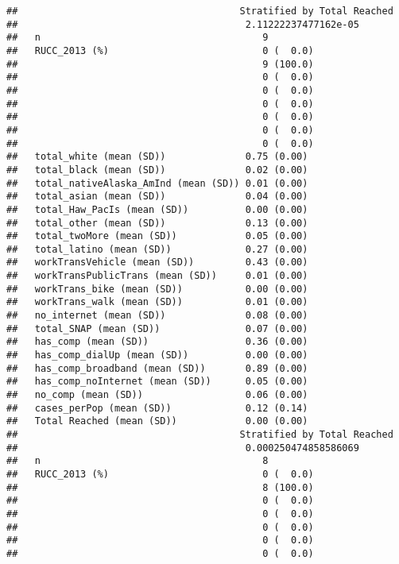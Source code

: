 \documentclass[
]{article}
\begin{document}
\begin{verbatim}
##                                       Stratified by Total Reached
##                                        2.11222237477162e-05
##   n                                       9                
##   RUCC_2013 (%)                           0 (  0.0)        
##                                           9 (100.0)        
##                                           0 (  0.0)        
##                                           0 (  0.0)        
##                                           0 (  0.0)        
##                                           0 (  0.0)        
##                                           0 (  0.0)        
##                                           0 (  0.0)        
##   total_white (mean (SD))              0.75 (0.00)         
##   total_black (mean (SD))              0.02 (0.00)         
##   total_nativeAlaska_AmInd (mean (SD)) 0.01 (0.00)         
##   total_asian (mean (SD))              0.04 (0.00)         
##   total_Haw_PacIs (mean (SD))          0.00 (0.00)         
##   total_other (mean (SD))              0.13 (0.00)         
##   total_twoMore (mean (SD))            0.05 (0.00)         
##   total_latino (mean (SD))             0.27 (0.00)         
##   workTransVehicle (mean (SD))         0.43 (0.00)         
##   workTransPublicTrans (mean (SD))     0.01 (0.00)         
##   workTrans_bike (mean (SD))           0.00 (0.00)         
##   workTrans_walk (mean (SD))           0.01 (0.00)         
##   no_internet (mean (SD))              0.08 (0.00)         
##   total_SNAP (mean (SD))               0.07 (0.00)         
##   has_comp (mean (SD))                 0.36 (0.00)         
##   has_comp_dialUp (mean (SD))          0.00 (0.00)         
##   has_comp_broadband (mean (SD))       0.89 (0.00)         
##   has_comp_noInternet (mean (SD))      0.05 (0.00)         
##   no_comp (mean (SD))                  0.06 (0.00)         
##   cases_perPop (mean (SD))             0.12 (0.14)         
##   Total Reached (mean (SD))            0.00 (0.00)         
##                                       Stratified by Total Reached
##                                        0.000250474858586069
##   n                                       8                
##   RUCC_2013 (%)                           0 (  0.0)        
##                                           8 (100.0)        
##                                           0 (  0.0)        
##                                           0 (  0.0)        
##                                           0 (  0.0)        
##                                           0 (  0.0)        
##                                           0 (  0.0)        

\end{verbatim}
\end{document}
